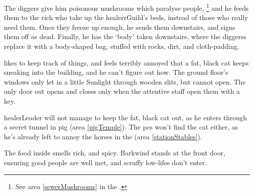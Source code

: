 \begin{multicols}{2}
\begin{exampletext}
  The \gls{diggers} give him poisonous mushrooms which paralyse people,
  \footnote{See area \vref{sewerMushrooms} in the .}
  and he feeds them to the rich who take up the \gls{healersGuild}'s beds, instead of those who really need them.
  Once they freeze up enough, he sends them downstairs, and signs them off as dead.
  Finally, he has the `body' taken downstairs, where the \glspl{diggers} replace it with a body-shaped bag, stuffed with rocks, dirt, and cloth-padding.
\end{exampletext}

 likes to keep track of things, and feels terribly annoyed that a fat, black cat keeps sneaking into the building, and he can't figure out how.
The ground floor's windows only let in a little Sunlight through wooden slits, but cannot open.
The only door out opens and closes only when the attentive staff open them with a key.

\Gls{healerLeader} will not manage to keep the fat, black cat out, as he enters through a secret tunnel in \gls{pig} (area \vref{pigTemple}).
The \glspl{pc} won't find the cat either, as he's already left to annoy the horses in the  (area \vref{stationStables}).

\healerLeader

The food inside smells rich, and spicy.
Barkwind stands at the front door, ensuring good people are well met, and scruffy low-lifes don't enter.



\end{multicols}

